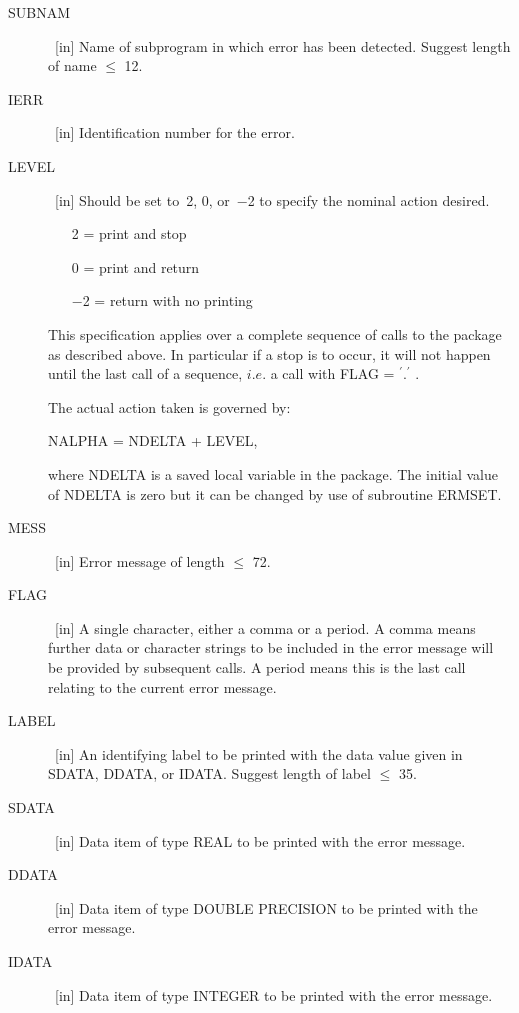 \documentclass[twoside]{MATH77}
\begin{document}
\begin{description}

\item[SUBNAM] \ [in] Name of subprogram in which error has been detected. Suggest
length of name $\leq $ 12.

\item[IERR] \ [in] Identification number for the error.

\item[LEVEL] \ [in] Should be set to~2, 0, or~$-$2 to specify the nominal
action desired.
\begin{itemize}
\item[2] = print and stop
\item[0] = print and return
\item[$-$2] = return with no printing
\end{itemize}
This specification applies over a complete sequence of calls to the package
as described above. In particular if a stop is to occur, it will not happen
until the last call of a sequence, $i.e$. a call with
FLAG = $^{\prime}.^{\prime}$ .

The actual action taken is governed by:

\hspace{.2in}NALPHA = NDELTA + LEVEL,

where NDELTA is a saved local variable in the package. The initial value of
NDELTA is zero but it can be changed by use of subroutine ERMSET.

\item[MESS] \ [in] Error message of length $\leq $ 72.

\item[FLAG] \ [in] A single character, either a comma or a period. A comma means
further data or character strings to be included in the error message will
be provided by subsequent calls. A period means this is the last call
relating to the current error message.

\item[LABEL] \ [in] An identifying label to be printed with the data value given in
SDATA, DDATA, or IDATA. Suggest length of label $\leq $ 35.

\item[SDATA] \ [in] Data item of type REAL to be printed with the error message.

\item[DDATA] \ [in] Data item of type DOUBLE PRECISION to be printed with the error
message.

\item[IDATA] \ [in] Data item of type INTEGER to be printed with the error message.


\end{description}
\end{document}
